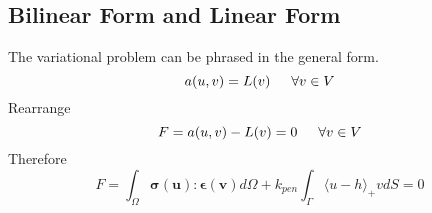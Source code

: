 \documentclass[12pt,3p]{article}
\begin{document}
\subsection{Bilinear Form and Linear Form}
The variational problem can be phrased in the general form.
\begin{equation*}
a(u,v) = L(v)  \indent \forall v \in V
\end{equation*}
Rearrange 
\begin{equation*}
F = a(u,v) - L(v) = 0   \indent \forall v \in V
\end{equation*}
Therefore 
\begin{equation}\label{WeakForm}
F = \int_{\Omega} \mathbf{ \sigma(u) : \epsilon(v) } d \Omega + k_{pen} \int_{\Gamma} \langle u - h \rangle_{+} v dS  = 0 
\end{equation}
\end{document}
